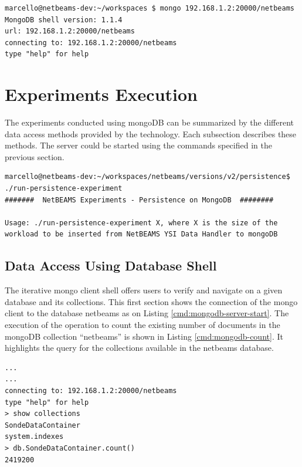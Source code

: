 \lstset{label=cmd:mongodb-client-start,caption=Starting the Server}
\begin{lstlisting}
marcello@netbeams-dev:~/workspaces $ mongo 192.168.1.2:20000/netbeams
MongoDB shell version: 1.1.4
url: 192.168.1.2:20000/netbeams
connecting to: 192.168.1.2:20000/netbeams
type "help" for help
\end{lstlisting}

\section{Experiments Execution}
\label{sec:experiment-execution}

The experiments conducted using mongoDB can be summarized by the different data
access methods provided by the technology. Each subsection describes these 
methods. The server could be started using the commands specified in the
previous section.

\lstset{label=cmd:run-persistence-experiment,caption=Running main experiment
shell script}
\begin{lstlisting}
marcello@netbeams-dev:~/workspaces/netbeams/versions/v2/persistence$ ./run-persistence-experiment 
#######  NetBEAMS Experiments - Persistence on MongoDB  ########

Usage: ./run-persistence-experiment X, where X is the size of the workload to be inserted from NetBEAMS YSI Data Handler to mongoDB
\end{lstlisting}


\subsection{Data Access Using Database Shell}
\label{sec:mongodb-user-experience}

The iterative mongo client shell offers users to verify and navigate on a
given database and its collections. This first section shows the connection of
the mongo client to the database netbeams as on Listing
\ref{cmd:mongodb-server-start}. The execution of the operation to count the
existing number of documents in the mongoDB collection ``netbeams'' is shown in
Listing \ref{cmd:mongodb-count}. It highlights the query for the collections
available \cite{mongodb} in the netbeams database.

\lstset{label=cmd:mongodb-count,caption=Starting the Server}
\begin{lstlisting}
...
...
connecting to: 192.168.1.2:20000/netbeams
type "help" for help
> show collections
SondeDataContainer
system.indexes
> db.SondeDataContainer.count()
2419200
\end{lstlisting}

